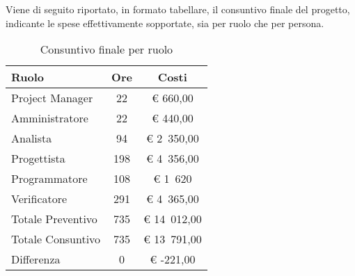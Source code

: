 	Viene di seguito riportato, in formato tabellare, il consuntivo finale del progetto, indicante le spese effettivamente sopportate, sia per ruolo che per persona.
	
	\begin{table}[H]
				\begin{center}
					\begin{tabular}{| l | c | c |}
						\hline
						Ruolo 				& Ore 	& Costi  \\ \hline
						
						Project Manager		& 22		& \euro{} 660,00 \\
						Amministratore 		& 22	& \euro{} 440,00 	\\
						Analista	 		& 94		& \euro{} 2~350,00 \\
						Progettista 		& 198		& \euro{} 4~356,00  \\
						Programmatore		& 108				& \euro{} 1~620	\\
						Verificatore		& 291	& \euro{} 4~365,00	\\ \hline \hline
							
						Totale Preventivo	& 735 			& \euro{} 14~012,00 	\\ \hline
						Totale Consuntivo	& 735 			& \euro{} 13~791,00 	\\ \hline
						Differenza			& 0 			& \euro{} -221,00 	\\ \hline	
					\end{tabular}
				\end{center}
				\caption{Consuntivo finale per ruolo}
			\end{table}
	
